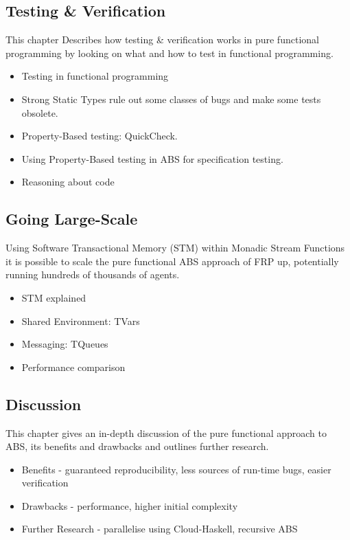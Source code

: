 \subsection{Testing \& Verification}
This chapter Describes how testing \& verification works in pure functional programming by looking on what and how to test in functional programming.
\begin{itemize}
	\item Testing in functional programming
	\item Strong Static Types rule out some classes of bugs and make some tests obsolete.
	\item Property-Based testing: QuickCheck.
	\item Using Property-Based testing in ABS for specification testing.
	\item Reasoning about code
\end{itemize}


\subsection{Going Large-Scale}
Using Software Transactional Memory (STM) within Monadic Stream Functions it is possible to scale the pure functional ABS approach of FRP up, potentially running hundreds of thousands of agents.

\begin{itemize}
	\item STM explained
	\item Shared Environment: TVars
	\item Messaging: TQueues
	\item Performance comparison
\end{itemize}

\subsection{Discussion}
This chapter gives an in-depth discussion of the pure functional approach to ABS, its benefits and drawbacks and outlines further research.
\begin{itemize}
	\item Benefits - guaranteed reproducibility, less sources of run-time bugs, easier verification
	\item Drawbacks - performance, higher initial complexity
	\item Further Research - parallelise using Cloud-Haskell, recursive ABS
\end{itemize}

